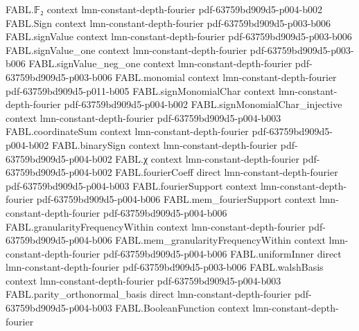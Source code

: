 \begin{theorem}
\label{FABL.expect_eq_indexedFourierCoeff_empty}
\leanok
{}
\proofstep
  {FABL.𝔽₂}
  {context}
  {lmn-constant-depth-fourier}
  {pdf-63759bd909d5-p004-b002}
\proofstep
  {FABL.Sign}
  {context}
  {lmn-constant-depth-fourier}
  {pdf-63759bd909d5-p003-b006}
\proofstep
  {FABL.signValue}
  {context}
  {lmn-constant-depth-fourier}
  {pdf-63759bd909d5-p003-b006}
\proofstep
  {FABL.signValue_one}
  {context}
  {lmn-constant-depth-fourier}
  {pdf-63759bd909d5-p003-b006}
\proofstep
  {FABL.signValue_neg_one}
  {context}
  {lmn-constant-depth-fourier}
  {pdf-63759bd909d5-p003-b006}
\proofstep
  {FABL.monomial}
  {context}
  {lmn-constant-depth-fourier}
  {pdf-63759bd909d5-p011-b005}
\proofstep
  {FABL.signMonomialChar}
  {context}
  {lmn-constant-depth-fourier}
  {pdf-63759bd909d5-p004-b002}
\proofstep
  {FABL.signMonomialChar_injective}
  {context}
  {lmn-constant-depth-fourier}
  {pdf-63759bd909d5-p004-b003}
\proofstep
  {FABL.coordinateSum}
  {context}
  {lmn-constant-depth-fourier}
  {pdf-63759bd909d5-p004-b002}
\proofstep
  {FABL.binarySign}
  {context}
  {lmn-constant-depth-fourier}
  {pdf-63759bd909d5-p004-b002}
\proofstep
  {FABL.χ}
  {context}
  {lmn-constant-depth-fourier}
  {pdf-63759bd909d5-p004-b002}
\proofstep
  {FABL.fourierCoeff}
  {direct}
  {lmn-constant-depth-fourier}
  {pdf-63759bd909d5-p004-b003}
\proofstep
  {FABL.fourierSupport}
  {context}
  {lmn-constant-depth-fourier}
  {pdf-63759bd909d5-p004-b006}
\proofstep
  {FABL.mem_fourierSupport}
  {context}
  {lmn-constant-depth-fourier}
  {pdf-63759bd909d5-p004-b006}
\proofstep
  {FABL.granularityFrequencyWithin}
  {context}
  {lmn-constant-depth-fourier}
  {pdf-63759bd909d5-p004-b006}
\proofstep
  {FABL.mem_granularityFrequencyWithin}
  {context}
  {lmn-constant-depth-fourier}
  {pdf-63759bd909d5-p004-b006}
\proofstep
  {FABL.uniformInner}
  {direct}
  {lmn-constant-depth-fourier}
  {pdf-63759bd909d5-p003-b006}
\proofstep
  {FABL.walshBasis}
  {context}
  {lmn-constant-depth-fourier}
  {pdf-63759bd909d5-p004-b003}
\proofstep
  {FABL.parity_orthonormal_basis}
  {direct}
  {lmn-constant-depth-fourier}
  {pdf-63759bd909d5-p004-b003}
\proofstep
  {FABL.BooleanFunction}
  {context}
  {lmn-constant-depth-fourier}

\end{theorem}
